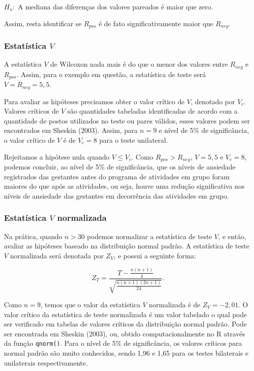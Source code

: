 \documentclass[
  letterpaper,
  DIV=11,
  numbers=noendperiod]{scrreprt}
\begin{document}
\(H_{\mathrm{a}}:\) A mediana das diferenças dos valores pareados é
maior que zero.

Assim, resta identificar se \(R_{pos}\) é de fato significativamente
maior que \(R_{neg}\).

\hypertarget{estatuxedstica-v}{%
\subsubsection{\texorpdfstring{Estatística
\(V\)}{Estatística V}}\label{estatuxedstica-v}}

A estatística \(V\) de Wilcoxon nada mais é do que o menor dos valores
entre \(R_{neg}\) e \(R_{pos}\). Assim, para o exemplo em questão, a
estatística de teste será \(V = R_{neg} = 5,5\).

Para avaliar as hipóteses precisamos obter o valor crítico de \(V\),
denotado por \(V_c\). Valores críticos de \(V\) são quantidades
tabeladas identificadas de acordo com a quantidade de postos utilizados
no teste ou pares válidos, esses valores podem ser encontrados em
Sheskin (2003). Assim, para \(n = 9\) e nível de 5\% de significância, o
valor crítico de \(V\) é de \(V_c = 8\) para o teste unilateral.

Rejeitamos a hipótese nula quando \(V \leq V_c\). Como
\(R_{pos} > R_{neg}\), \(V = 5,5\) e \(V_c = 8\), podemos concluir, ao
nível de 5\% de significância, que os níveis de ansiedade registrados
das gestantes antes do programa de atividades em grupo foram maiores do
que após as atividades, ou seja, houve uma redução significativa nos
níveis de ansiedade das gestantes em decorrência das atividades em
grupo.

\hypertarget{estatuxedstica-v-normalizada}{%
\subsubsection{\texorpdfstring{Estatística \(V\)
normalizada}{Estatística V normalizada}}\label{estatuxedstica-v-normalizada}}

Na prática, quando \(n > 30\) podemos normalizar a estatística de teste
\(V\), e então, avaliar as hipóteses baseado na distribuição normal
padrão. A estatística de teste \(V\) normalizada será denotada por
\(Z_V\), e possui a seguinte forma:

\[Z_T=\displaystyle \frac{T-\displaystyle\frac{n(n+1)}{4}}{\sqrt{\displaystyle\frac{n(n+1)(2 n+1)}{24}}}.\]

Como \(n = 9\), temos que o valor da estatística \(V\) normalizada é de
\(Z_V = -2,01\). O valor crítico da estatística de teste normalizada é
um valor tabelado o qual pode ser verificado em tabelas de valores
críticos da distribuição normal padrão. Pode ser encontrada em Sheskin
(2003), ou, obtido computacionalmente no R através da função
\texttt{qnorm()}. Para o nível de 5\% de significância, os valores
críticos para normal padrão são muito conhecidos, sendo 1,96 e 1,65 para
os testes bilaterais e unilaterais respectivamente.
\end{document}
